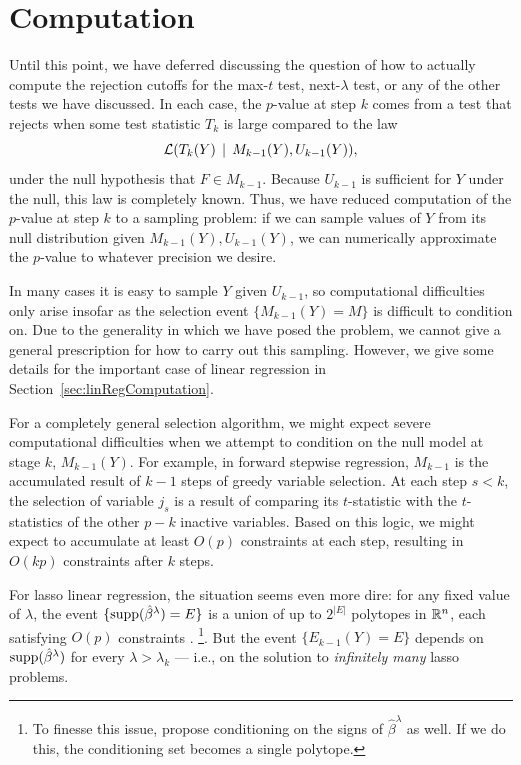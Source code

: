 \documentclass{article}
\begin{document}
\section{Computation}
\label{sec:computation}

Until this point, we have deferred discussing the question of how to actually compute the rejection cutoffs for the max-$t$ test, next-$\lambda$ test, or any of the other tests we have discussed. In each case, the $p$-value at step $k$ comes from a test that rejects when some test statistic $T_k$ is large compared to the law
\begin{equation}\label{eq:genDist}
\mathcal{L}(T_k(Y) \,\mid\, M_{k-1}(Y), U_{k-1}(Y)),
\end{equation}
under the null hypothesis that $F\in M_{k-1}$. Because $U_{k-1}$ is sufficient for $Y$ under the null, this law is completely known. Thus, we have reduced computation of the $p$-value at step $k$ to a sampling problem: if we can sample values of $Y$ from its null distribution given $M_{k-1}(Y), U_{k-1}(Y)$, we can numerically approximate the $p$-value to whatever precision we desire.

In many cases it is easy to sample $Y$ given $U_{k-1}$, so computational difficulties only arise insofar as the selection event $\{M_{k-1}(Y)=M\}$ is difficult to condition on. Due to the generality in which we have posed the problem, we cannot give a general prescription for how to carry out this sampling. However, we give some details for the important case of linear regression in Section~\ref{sec:linRegComputation}.

For a completely general selection algorithm, we might expect severe computational difficulties when we attempt to condition on the null model at stage $k$, $M_{k-1}(Y)$. For example, in forward stepwise regression, $M_{k-1}$ is the accumulated result of $k-1$ steps of greedy variable selection. At each step $s<k$, the selection of variable $j_s$ is a result of comparing its $t$-statistic with the $t$-statistics of the other $p-k$ inactive variables. Based on this logic, we might expect to accumulate at least $O(p)$ constraints at each step, resulting in $O(kp)$ constraints after $k$ steps.

For lasso linear regression, the situation seems even more dire: for any fixed value of $\lambda$, the event $\{\text{supp}(\hat\beta^\lambda) = E\}$ is a union of up to $2^{|E|}$ polytopes in $\mathbb{R}^n$, each satisfying $O(p)$ constraints \citep{lee2013exact}. \footnote{To finesse this issue, \citet{lee2013exact} propose conditioning on the signs of $\hat\beta^\lambda$ as well. If we do this, the conditioning set becomes a single polytope.}. But the event $\{E_{k-1}(Y)=E\}$ depends on $\text{supp}(\hat\beta^\lambda)$ for every $\lambda > \lambda_k$ --- i.e., on the solution to {\em infinitely many} lasso problems.
\end{document}
